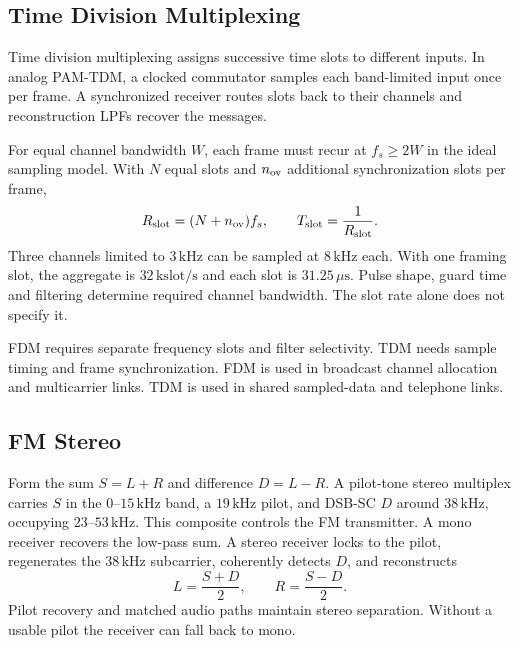 \documentclass[12pt,a4paper]{article}
\begin{document}
\subsection{Time Division Multiplexing}
\begin{tcolorbox}[defbox, title={Synchronous TDM}]
Time division multiplexing assigns successive time slots to different inputs. In analog PAM-TDM, a clocked commutator samples each band-limited input once per frame. A synchronized receiver routes slots back to their channels and reconstruction LPFs recover the messages.
\end{tcolorbox}
For equal channel bandwidth $W$, each frame must recur at $f_s\ge 2W$ in the ideal sampling model. With $N$ equal slots and $n_{\rm ov}$ additional synchronization slots per frame,
\[
 R_{\rm slot}=(N+n_{\rm ov})f_s,\qquad
 T_{\rm slot}=\frac{1}{R_{\rm slot}}.
\]
Three channels limited to $3\,\mathrm{kHz}$ can be sampled at $8\,\mathrm{kHz}$ each. With one framing slot, the aggregate is $32\,\mathrm{kslot/s}$ and each slot is $31.25\,\mu\mathrm{s}$. Pulse shape, guard time and filtering determine required channel bandwidth. The slot rate alone does not specify it.

\begin{tcolorbox}[tikzbox, unbreakable, title={Two Frames of Three-Channel TDM}]
\centering
{}\par
\end{tcolorbox}

FDM requires separate frequency slots and filter selectivity. TDM needs sample timing and frame synchronization. FDM is used in broadcast channel allocation and multicarrier links. TDM is used in shared sampled-data and telephone links.

\subsection{FM Stereo}
Form the sum $S=L+R$ and difference $D=L-R$. A pilot-tone stereo multiplex carries $S$ in the $0$--$15\,\mathrm{kHz}$ band, a $19\,\mathrm{kHz}$ pilot, and DSB-SC $D$ around $38\,\mathrm{kHz}$, occupying $23$--$53\,\mathrm{kHz}$. This composite controls the FM transmitter. A mono receiver recovers the low-pass sum. A stereo receiver locks to the pilot, regenerates the $38\,\mathrm{kHz}$ subcarrier, coherently detects $D$, and reconstructs
\[
 L=\frac{S+D}{2},\qquad R=\frac{S-D}{2}.
\]
Pilot recovery and matched audio paths maintain stereo separation. Without a usable pilot the receiver can fall back to mono.
\end{document}
